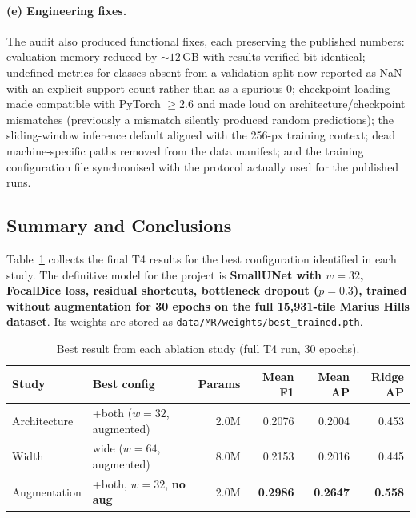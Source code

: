 \paragraph{(e) Engineering fixes.}
The audit also produced functional fixes, each preserving the published numbers: evaluation memory reduced by ${\sim}12$\,GB with results verified bit-identical; undefined metrics for classes absent from a validation split now reported as NaN with an explicit support count rather than as a spurious 0; checkpoint loading made compatible with PyTorch $\geq 2.6$ and made loud on architecture/checkpoint mismatches (previously a mismatch silently produced random predictions); the sliding-window inference default aligned with the 256-px training context; dead machine-specific paths removed from the data manifest; and the training configuration file synchronised with the protocol actually used for the published runs.

\subsection{Summary and Conclusions}
\label{sec:mr_conclusions}

Table~\ref{tab:final_summary} collects the final T4 results for the best configuration identified in each study. The definitive model for the project is \textbf{SmallUNet with $w=32$, FocalDice loss, residual shortcuts, bottleneck dropout ($p=0.3$), trained without augmentation for 30 epochs on the full 15{,}931-tile Marius Hills dataset}. Its weights are stored as \texttt{data/MR/weights/best\_trained.pth}.

\begin{table}[h]
\centering
\caption{Best result from each ablation study (full T4 run, 30 epochs).}
\label{tab:final_summary}
\begin{tabular}{llrrrr}
\toprule
Study & Best config & Params & Mean F1 & Mean AP & Ridge AP \\
\midrule
Architecture & +both ($w=32$, augmented) & 2.0M & 0.2076 & 0.2004 & 0.453 \\
Width        & wide ($w=64$, augmented)  & 8.0M & 0.2153 & 0.2016 & 0.445 \\
Augmentation & +both, $w=32$, \textbf{no aug} & 2.0M & \textbf{0.2986} & \textbf{0.2647} & \textbf{0.558} \\
\bottomrule
\end{tabular}
\end{table}

